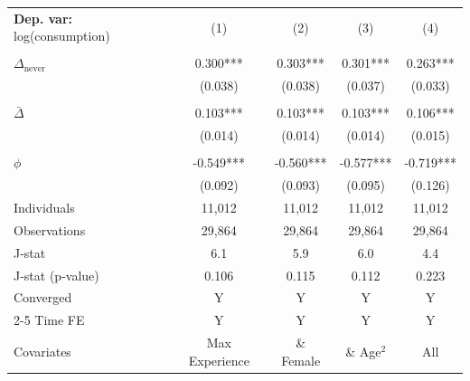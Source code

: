 \begin{tabular}{l cccc} \toprule  \textbf{Dep. var:}  log(consumption) 
                    &\multicolumn{1}{c}{(1)}   &\multicolumn{1}{c}{(2)}   &\multicolumn{1}{c}{(3)}   &\multicolumn{1}{c}{(4)}   \\
                    &               &               &               &               \\
\addlinespace
$\Delta_{\text{never}}$&       0.300***&       0.303***&       0.301***&       0.263***\\
                    &     (0.038)   &     (0.038)   &     (0.037)   &     (0.033)   \\
                    &               &               &               &               \\
\addlinespace
$\bar{\Delta}$      &       0.103***&       0.103***&       0.103***&       0.106***\\
                    &     (0.014)   &     (0.014)   &     (0.014)   &     (0.015)   \\
                    &               &               &               &               \\
\addlinespace
$\phi$              &      -0.549***&      -0.560***&      -0.577***&      -0.719***\\
                    &     (0.092)   &     (0.093)   &     (0.095)   &     (0.126)   \\
\addlinespace
Individuals         &      11,012   &      11,012   &      11,012   &      11,012   \\
Observations        &      29,864   &      29,864   &      29,864   &      29,864   \\
J-stat              &         6.1   &         5.9   &         6.0   &         4.4   \\
J-stat (p-value)    &       0.106   &       0.115   &       0.112   &       0.223   \\
Converged           &           Y   &           Y   &           Y   &           Y   \\
\cmidrule{2-5} Time FE & Y & Y & Y & Y \\ Covariates & Max Experience & \& Female & \& Age$^2$ & All \\ \bottomrule \end{tabular}
